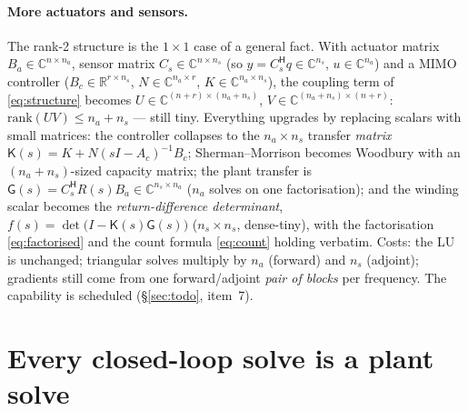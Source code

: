 \documentclass[11pt,a4paper]{article}
\newcommand{\R}{\mathbb{R}}
\newcommand{\C}{\mathbb{C}}
\newcommand{\hp}{^{\mathsf H}}
\begin{document}
{\paragraph{More actuators and sensors.}  The rank-2 structure is the $1{\times}1$ case of a
general fact.  With actuator matrix
$B_a\in\C^{n\times n_a}$, sensor matrix $C_s\in\C^{n\times n_s}$ (so $y=C_s\hp q\in\C^{n_s}$,
$u\in\C^{n_a}$) and a MIMO controller ($B_c\in\R^{r\times n_s}$, $N\in\C^{n_a\times r}$,
$K\in\C^{n_a\times n_s}$), the coupling term of \eqref{eq:structure} becomes
$U\in\C^{(n+r)\times(n_a+n_s)}$, $V\in\C^{(n_a+n_s)\times(n+r)}$:
$\mathrm{rank}(UV)\le n_a+n_s$ --- still tiny.  Everything upgrades by replacing scalars
with small matrices: the controller collapses to the $n_a\times n_s$ transfer
\emph{matrix} $\mathsf K(s)=K+N(sI-A_c)^{-1}B_c$; Sherman--Morrison becomes Woodbury with
an $(n_a{+}n_s)$-sized capacity matrix; the plant transfer is
$\mathsf G(s)=C_s\hp R(s)B_a\in\C^{n_s\times n_a}$ ($n_a$ solves on one factorisation);
and the winding scalar becomes the \emph{return-difference determinant},
$f(s)=\det\bigl(I-\mathsf K(s)\mathsf G(s)\bigr)$ ($n_s\times n_s$, dense-tiny), with the
factorisation \eqref{eq:factorised} and the count formula \eqref{eq:count} holding
verbatim.  Costs: the LU is unchanged; triangular solves multiply by $n_a$ (forward) and
$n_s$ (adjoint); gradients still come from one forward/adjoint \emph{pair of blocks} per
frequency.  The capability is scheduled (\S\ref{sec:todo}, item~7).

\section{Every closed-loop solve is a plant solve}
\label{sec:solve}

}
\end{document}
